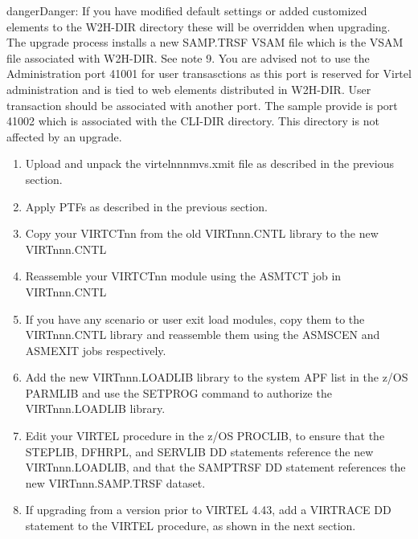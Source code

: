 \documentclass[letterpaper,10pt,english]{sphinxmanual}
\begin{document}
\begin{sphinxadmonition}{danger}{Danger:}
If you have modified default settings or added customized elements to the W2H-DIR directory these will be overridden when upgrading. The upgrade process installs a new SAMP.TRSF VSAM file which is the VSAM file associated with W2H-DIR. See note 9. You are advised not to use the Administration port 41001 for user transasctions as this port is reserved for Virtel administration and is tied to web elements distributed in W2H-DIR. User transaction should be associated with another port. The sample provide is port 41002 which is associated with the CLI-DIR directory. This directory is not affected by an upgrade.
\end{sphinxadmonition}
\begin{enumerate}
\def\theenumi{\arabic{enumi}}
\def\labelenumi{\theenumi .}
\makeatletter\def\p@enumii{\p@enumi \theenumi .}\makeatother
\item {} 
Upload and unpack the virtelnnnmvs.xmit file as described in the previous section.

\item {} 
Apply PTFs as described in the previous section.

\item {} 
Copy your VIRTCTnn from the old VIRTnnn.CNTL library to the new VIRTnnn.CNTL

\item {} 
Reassemble your VIRTCTnn module using the ASMTCT job in VIRTnnn.CNTL

\item {} 
If you have any scenario or user exit load modules, copy them to the VIRTnnn.CNTL library and reassemble them using the ASMSCEN and ASMEXIT jobs respectively.

\item {} 
Add the new VIRTnnn.LOADLIB library to the system APF list in the z/OS PARMLIB and use the SETPROG command to authorize the VIRTnnn.LOADLIB library.

\item {} 
Edit your VIRTEL procedure in the z/OS PROCLIB, to ensure that the STEPLIB, DFHRPL, and SERVLIB DD statements reference the new VIRTnnn.LOADLIB, and that the SAMPTRSF DD statement references the new VIRTnnn.SAMP.TRSF dataset.

\item {} 
If upgrading from a version prior to VIRTEL 4.43, add a VIRTRACE DD statement to the VIRTEL procedure, as shown in the next section.


\end{enumerate}
\end{document}
